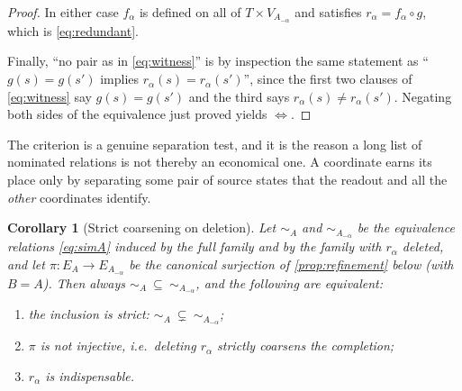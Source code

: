 \documentclass[11pt,reqno]{amsart}
\theoremstyle{plain}
\newtheorem{corollary}[theorem]{Corollary}
\theoremstyle{definition}
\theoremstyle{remark}
\numberwithin{equation}{section}
\begin{document}
\begin{proof}
In either case $f_\alpha$ is defined on all of $T\times V_{A_{-\alpha}}$ and satisfies
$r_\alpha=f_\alpha\circ g$, which is \eqref{eq:redundant}.

Finally, ``no pair as in \eqref{eq:witness}'' is by inspection the same statement as ``$g(s)=g(s')$
implies $r_\alpha(s)=r_\alpha(s')$'', since the first two clauses of \eqref{eq:witness} say
$g(s)=g(s')$ and the third says $r_\alpha(s)\neq r_\alpha(s')$. Negating both sides of the
equivalence just proved yields $\Leftrightarrow$.
\end{proof}

The criterion is a genuine separation test, and it is the reason a long list of nominated relations
is not thereby an economical one. A coordinate earns its place only by separating some pair of source
states that the readout and all the \emph{other} coordinates identify.

\begin{corollary}[Strict coarsening on deletion]
\label{cor:deletion}
Let $\sim_A$ and $\sim_{A_{-\alpha}}$ be the equivalence relations \eqref{eq:simA} induced by the
full family and by the family with $r_\alpha$ deleted, and let $\pi\colon E_A\to E_{A_{-\alpha}}$ be
the canonical surjection of \cref{prop:refinement} below (with $B=A$). Then always
$\sim_A\ \subseteq\ \sim_{A_{-\alpha}}$, and the following are equivalent:
\begin{enumerate}
\item the inclusion is \emph{strict}: $\sim_A\ \subsetneq\ \sim_{A_{-\alpha}}$;
\item $\pi$ is not injective, i.e.\ deleting $r_\alpha$ \emph{strictly coarsens} the completion;
\item $r_\alpha$ is indispensable.
\end{enumerate}
\end{corollary}
\end{document}
